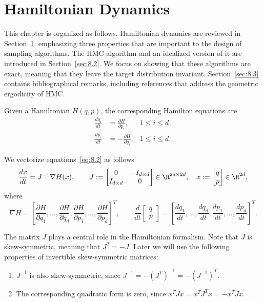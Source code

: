 
\section{Hamiltonian Dynamics}
\label{sec:8.1}

This chapter is organized as follows. Hamiltonian dynamics are reviewed in Section~\ref{sec:8.1},
emphasizing three properties that are important to the design of sampling algorithms. The HMC
algorithm and an idealized version of it are introduced in Section~\ref{sec:8.2}. We focus on
showing that these algorithms are exact, meaning that they leave the target distribution
invariant. Section~\ref{sec:8.3} contains bibliographical remarks, including references that
address the geometric ergodicity of HMC.

\medskip
Given a Hamiltonian $H(q,p)$, the corresponding Hamilton equations are
\begin{equation}
\label{eq:8.2}
\begin{aligned}
\frac{dq_i}{dt} &= \frac{\partial H}{\partial p_i}, & 1 \le i \le d, \\[4pt]
\frac{dp_i}{dt} &= -\frac{\partial H}{\partial q_i}, & 1 \le i \le d.
\end{aligned}
\end{equation}

We vectorize equations~\eqref{eq:8.2} as follows
\[
\frac{dx}{dt} = J^{-1}\nabla H(x), \qquad
J := \begin{bmatrix} 0 & -I_{d\times d} \\ I_{d\times d} & 0 \end{bmatrix}
\in \R^{2d\times 2d}, \quad
x := \begin{bmatrix} q \\ p \end{bmatrix} \in \R^{2d},
\]
where
\[
\nabla H = \left[\frac{\partial H}{\partial q_1}, \ldots,
\frac{\partial H}{\partial q_d},
\frac{\partial H}{\partial p_1}, \ldots,
\frac{\partial H}{\partial p_d}\right]^T, \qquad
\frac{d}{dt}\begin{bmatrix}q\\p\end{bmatrix}
= \left[\frac{dq_1}{dt},\ldots,\frac{dq_d}{dt},\frac{dp_1}{dt},\ldots,\frac{dp_d}{dt}\right]^T.
\]

The matrix $J$ plays a central role in the Hamiltonian formalism. Note that $J$ is
skew-symmetric, meaning that $J^T = -J$. Later we will use the following properties of
invertible skew-symmetric matrices:
\begin{enumerate}
  \item $J^{-1}$ is also skew-symmetric, since $J^{-1} = -(J^T)^{-1} = -(J^{-1})^T$.
  \item The corresponding quadratic form is zero, since $x^T J x = x^T J^T x = -x^T J x$.
\end{enumerate}

